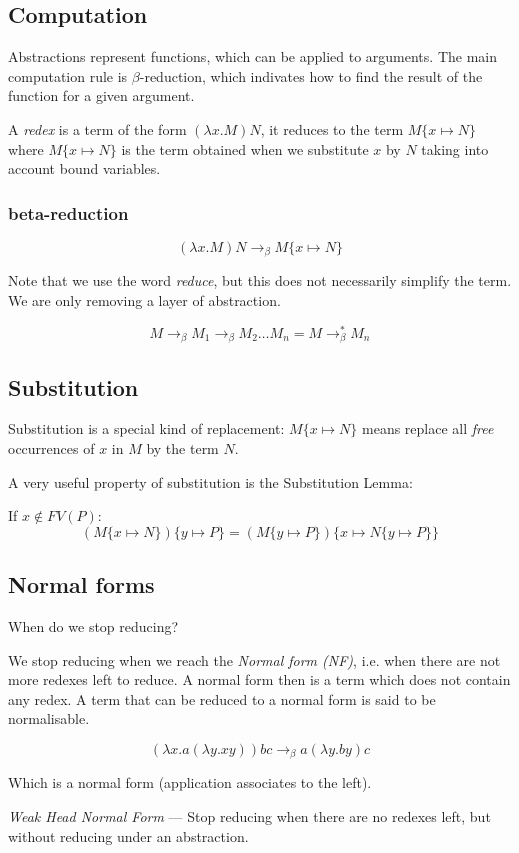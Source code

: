 \subsection{Computation}
Abstractions represent functions, which can be applied to arguments. The main computation rule is $\beta$-reduction, which indivates
how to find the result of the function for a given argument.

A \textit{redex} is a term of the form $(\lambda x.M)N$, it reduces to the term $M\{x\mapsto N\}$ where $M\{x\mapsto N\}$ is the term
obtained when we substitute $x$ by $N$ taking into account bound variables.

\subsubsection{beta-reduction}
$$
(\lambda x.M)N\to_\beta M\{x\mapsto N\}
$$

Note that we use the word \textit{reduce}, but this does not necessarily simplify the term. We are only removing
a layer of abstraction.

$$
M\to_\beta M_1\to_\beta M_2\ldots M_n = M\to_\beta^* M_n
$$

\subsection{Substitution}
Substitution is a special kind of replacement: $M\{x\mapsto N\}$ means replace all \textit{free} occurrences of $x$ in $M$ by the term $N$.

A very useful property of substitution is the Substitution Lemma:

If $x\notin FV(P)$:
\begin{equation}
    (M\{x\mapsto N\})\{y\mapsto P\} = (M\{y\mapsto P\})\{x\mapsto N\{y\mapsto P\}\}
\end{equation}

\subsection{Normal forms}
When do we stop reducing?

We stop reducing when we reach the \textit{Normal form (NF)}, i.e. when there are not more redexes left to reduce.
A normal form then is a term which does not contain any redex. A term that can be reduced to a normal form is said to be
normalisable.

\begin{equation}
    (\lambda x.a(\lambda y.xy))bc\to_\beta a(\lambda y.by)c
\end{equation}

Which is a normal form (application associates to the left).

\textit{Weak Head Normal Form} --- Stop reducing when there are no redexes left, but without reducing under an abstraction.
    